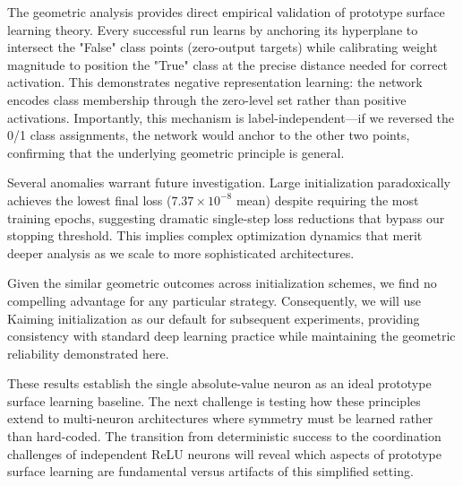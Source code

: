 The geometric analysis provides direct empirical validation of prototype surface learning theory. Every successful run learns by anchoring its hyperplane to intersect the "False" class points (zero-output targets) while calibrating weight magnitude to position the "True" class at the precise distance needed for correct activation. This demonstrates negative representation learning: the network encodes class membership through the zero-level set rather than positive activations. Importantly, this mechanism is label-independent—if we reversed the 0/1 class assignments, the network would anchor to the other two points, confirming that the underlying geometric principle is general.

Several anomalies warrant future investigation. Large initialization paradoxically achieves the lowest final loss ($7.37 \times 10^{-8}$ mean) despite requiring the most training epochs, suggesting dramatic single-step loss reductions that bypass our stopping threshold. This implies complex optimization dynamics that merit deeper analysis as we scale to more sophisticated architectures.

Given the similar geometric outcomes across initialization schemes, we find no compelling advantage for any particular strategy. Consequently, we will use Kaiming initialization as our default for subsequent experiments, providing consistency with standard deep learning practice while maintaining the geometric reliability demonstrated here.

These results establish the single absolute-value neuron as an ideal prototype surface learning baseline. The next challenge is testing how these principles extend to multi-neuron architectures where symmetry must be learned rather than hard-coded. The transition from deterministic success to the coordination challenges of independent ReLU neurons will reveal which aspects of prototype surface learning are fundamental versus artifacts of this simplified setting.
